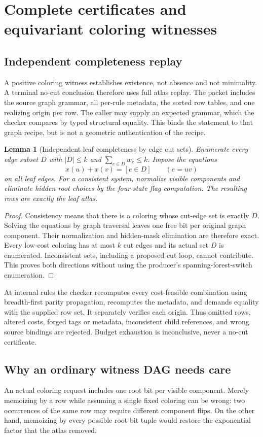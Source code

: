 \documentclass[11pt,letterpaper]{article}
\newtheorem{lemma}[theorem]{Lemma}
\theoremstyle{definition}
\theoremstyle{remark}\newtheorem{remark}[theorem]{Remark}
\begin{document}
\section{Complete certificates and equivariant coloring witnesses}
\label{sec:certificates}
\subsection{Independent completeness replay}
A positive coloring witness establishes existence, not absence and not minimality. A terminal no-cut conclusion therefore uses full atlas replay. The packet includes the source graph grammar, all per-rule metadata, the sorted row tables, and one realizing origin per row. The caller may supply an expected grammar, which the checker compares by typed structural equality. This binds the statement to that graph recipe, but is not a geometric authentication of the recipe.

\begin{lemma}[Independent leaf completeness by edge cut sets]\label{lem:edgecheck}
Enumerate every edge subset $D$ with $|D|\le k$ and $\sum_{e\in D}w_e\le k$. Impose the equations
\[
 x(u)+x(v)=[e\in D]\qquad(e=uv)
\]
on \emph{all} leaf edges. For a consistent system, normalize visible components and eliminate hidden root choices by the four-state flag computation. The resulting rows are exactly the leaf atlas.
\end{lemma}
\begin{proof}
Consistency means that there is a coloring whose cut-edge set is exactly $D$. Solving the equations by graph traversal leaves one free bit per original graph component. Their normalization and hidden-mask elimination are therefore exact. Every low-cost coloring has at most $k$ cut edges and its actual set $D$ is enumerated. Inconsistent sets, including a proposed cut loop, cannot contribute. This proves both directions without using the producer's spanning-forest-switch enumeration.
\end{proof}

At internal rules the checker recomputes every cost-feasible combination using breadth-first parity propagation, recomputes the metadata, and demands equality with the supplied row set. It separately verifies each origin. Thus omitted rows, altered costs, forged tags or metadata, inconsistent child references, and wrong source bindings are rejected. Budget exhaustion is inconclusive, never a no-cut certificate.

\subsection{Why an ordinary witness DAG needs care}
An actual coloring request includes one root bit per visible component. Merely memoizing by a row while assuming a single fixed coloring can be wrong: two occurrences of the same row may require different component flips. On the other hand, memoizing by every possible root-bit tuple would restore the exponential factor that the atlas removed.
\end{document}
